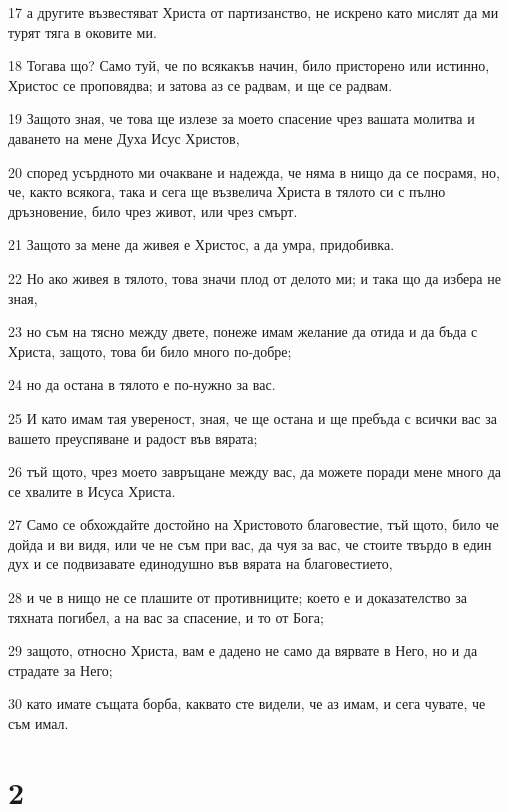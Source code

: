 \par 17 а другите възвестяват Христа от партизанство, не искрено като мислят да ми турят тяга в оковите ми.
\par 18 Тогава що? Само туй, че по всякакъв начин, било присторено или истинно, Христос се проповядва; и затова аз се радвам, и ще се радвам.
\par 19 Защото зная, че това ще излезе за моето спасение чрез вашата молитва и даването на мене Духа Исус Христов,
\par 20 според усърдното ми очакване и надежда, че няма в нищо да се посрамя, но, че, както всякога, така и сега ще възвелича Христа в тялото си с пълно дръзновение, било чрез живот, или чрез смърт.
\par 21 Защото за мене да живея е Христос, а да умра, придобивка.
\par 22 Но ако живея в тялото, това значи плод от делото ми; и така що да избера не зная,
\par 23 но съм на тясно между двете, понеже имам желание да отида и да бъда с Христа, защото, това би било много по-добре;
\par 24 но да остана в тялото е по-нужно за вас.
\par 25 И като имам тая увереност, зная, че ще остана и ще пребъда с всички вас за вашето преуспяване и радост във вярата;
\par 26 тъй щото, чрез моето завръщане между вас, да можете поради мене много да се хвалите в Исуса Христа.
\par 27 Само се обхождайте достойно на Христовото благовестие, тъй щото, било че дойда и ви видя, или че не съм при вас, да чуя за вас, че стоите твърдо в един дух и се подвизавате единодушно във вярата на благовестието,
\par 28 и че в нищо не се плашите от противниците; което е и доказателство за тяхната погибел, а на вас за спасение, и то от Бога;
\par 29 защото, относно Христа, вам е дадено не само да вярвате в Него, но и да страдате за Него;
\par 30 като имате същата борба, каквато сте видели, че аз имам, и сега чувате, че съм имал.

\chapter{2}


